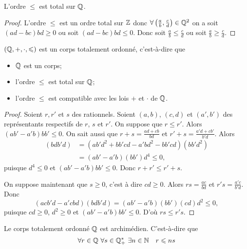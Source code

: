\begin{prop}
  L'ordre \(\leqslant \) est total sur \(\mathbb{Q}\).
\end{prop}
\begin{proof}
  L'ordre \(\leqslant \) est un ordre total sur \(\mathbb{Z}\) donc \(\forall \left( \frac{a}{b}, \frac{c}{d} \right) \in \mathbb{Q}^2\) on a soit \((ad-bc)bd \geqslant 0\) ou soit \((ad-bc)bd \leqslant 0\). Donc soit \(\frac{a}{b} \leqslant \frac{c}{d}\) ou soit \(\frac{a}{b} \geqslant \frac{c}{d}\).
\end{proof}
\begin{prop}
  \((\mathbb{Q},+,\cdot, \leqslant)\) est un corps totalement ordonné, c'est-à-dire que
  \begin{itemize}
  \item \(\mathbb{Q}\) est un corps;
  \item l'ordre \(\leqslant\) est total sur \(\mathbb{Q}\);
  \item l'ordre \(\leqslant\) est compatible avec les lois \(+\) et \(\cdot\) de \(\mathbb{Q}\).
  \end{itemize}
\end{prop}
\begin{proof}
  Soient \(r,r'\) et \(s\) des rationnels. Soient \((a,b)\), \((c,d)\) et \((a',b')\) des représentants respectifs de \(r\), \(s\) et \(r'\). On suppose que \(r \leqslant r'\). Alors \((ab'-a'b)bb' \leqslant 0\). On sait aussi que \(r+s = \frac{ad+cb}{bd}\) et \(r'+s=\frac{a'd+cb'}{b'd}\). Alors
  \begin{align}
    [(ad+bc)b'd-(a'd+cb')bd](bdb'd) &= (ab'd^2+bb'cd-a'bd^2-bb'cd)(bb'd^2) \\
    &=(ab'-a'b)(bb')d^4 \leqslant 0,
  \end{align}
  puisque \(d^4 \leqslant 0\) et \((ab'-a'b)bb' \leqslant 0\). Donc \(r+r' \leqslant r'+s\).

  On suppose maintenant que \(s \geqslant 0\), c'est à dire \(cd \geqslant 0\). Alors \(rs = \frac{ac}{bd}\) et \(r's = \frac{a'c}{b'd}\). Donc
  \begin{equation}
    (acb'd-a'cbd)(bdb'd) = (ab'-a'b)(bb')(cd)d^2 \leqslant 0,
  \end{equation}
  puisque \(cd \geqslant 0\), \(d^2 \geqslant 0\) et \((ab'-a'b)bb' \leqslant 0\). D'où \(rs \leqslant r's\).
\end{proof}
\begin{prop}
  Le corps totalement ordonné \(\mathbb{Q}\) est archimédien. C'est-à-dire que
  \begin{equation}
    \forall r \in \mathbb{Q} \ \forall s \in \mathbb{Q}^*_+ \ \exists n \in \mathbb{N} \quad r \leqslant ns
  \end{equation}
\end{prop}
